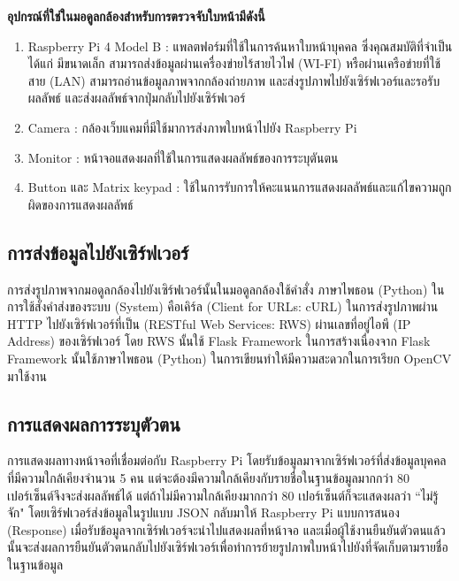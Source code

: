 \textbf{อุปกรณ์ที่ใช่ในมอดูลกล้องสำหรับการตรวจจับใบหน้ามีดังนี้}
\begin{enumerate}
  \item Raspberry Pi 4 Model B : แพลตฟอร์มที่ใช้ในการค้นหาใบหน้าบุคคล ซึ่งคุณสมบัติที่จำเป็นได้แก่ 
  มีขนาดเล็ก สามารถส่งข้อมูลผ่านเครื่องข่ายไร้สายไวไฟ (WI-FI) หรือผ่านเครือข่ายที่ใช้สาย (LAN) สามารถอ่านข้อมูลภาพจากกล้องถ่ายภาพ 
  และส่งรูปภาพไปยังเซิร์ฟเวอร์และรอรับผลลัพธ์ และส่งผลลัพธ์จากปุ่มกลับไปยังเซิร์ฟเวอร์
  \item Camera : กล้องเว็บแคมที่มีใช้มาการส่งภาพใบหน้าไปยัง Raspberry Pi
  \item Monitor : หน้าจอแสดงผลที่ใช้ในการแสดงผลลัพธ์ของการระบุตันตน
  \item Button และ Matrix keypad : ใช้ในการรับการให้คะแนนการแสดงผลลัพธ์และแก้ไขความถูกผิดของการแสดงผลลัพธ์
\end{enumerate}

\subsection{การส่งข้อมูลไปยังเซิร์ฟเวอร์}
การส่งรูปภาพจากมอดูลกล้องไปยังเซิร์ฟเวอร์นั้นในมอดูลกล้องใช้คำสั่ง ภาษาไพธอน (Python) ในการใช้สั่งคำส่งของระบบ (System)
คือเคิร์ล  (Client for URLs: cURL) ในการส่งรูปภาพผ่าน HTTP ไปยังเซิร์ฟเวอร์ที่เป็น (RESTful Web Services: RWS)
ผ่านเลขที่อยู่ไอพี (IP Address) ของเซิร์ฟเวอร์ โดย RWS นั้นใช้ Flask Framework 
ในการสร้างเนื่องจาก Flask Framework นั้นใช้ภาษาไพธอน (Python) ในการเขียนทำให้มีความสะดวกในการเรียก OpenCV มาใช้งาน

\subsection{การแสดงผลการระบุตัวตน}
การแสดงผลทางหน้าจอที่เชื่อมต่อกับ Raspberry Pi โดยรับข้อมูลมาจากเซิร์ฟเวอร์ที่ส่งข้อมูลบุคคลที่มีความใกล้เคียงจำนวน 5 คน 
แต่จะต้องมีความใกล้เคียงกับรายชื่อในฐานข้อมูลมากกว่า 80 เปอร์เซ็นต์จึงจะส่งผลลัพธ์ได้ แต่ถ้าไม่มีความใกล้เคียงมากกว่า 80 เปอร์เซ็นต์ก็จะแสดงผลว่า ``ไม่รู้จัก"
โดยเซิร์ฟเวอร์ส่งข้อมูลในรูปแบบ JSON กลับมาให้ Raspberry Pi แบบการสนอง (Response) เมื่อรับข้อมูลจากเซิร์ฟเวอร์จะนำไปแสดงผลที่หน้าจอ 
และเมื่อผู้ใช้งานยืนยันตัวตนแล้วนั้นจะส่งผลการยืนยันตัวตนกลับไปยังเซิร์ฟเวอร์เพื่อทำการย้ายรูปภาพใบหน้าไปยังที่จัดเก็บตามรายชื่อในฐานข้อมูล

